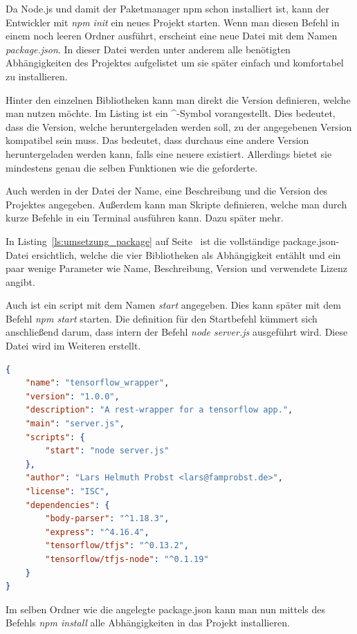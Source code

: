 Da Node.js und damit der Paketmanager npm schon installiert ist, kann der Entwickler mit \textit{npm init} ein neues 
Projekt starten. Wenn man diesen Befehl in einem noch leeren Ordner ausführt, erscheint eine neue Datei mit dem Namen
\textit{package.json}. In dieser Datei werden unter anderem alle benötigten Abhängigkeiten des Projektes aufgelistet 
um sie später einfach und komfortabel zu installieren.

Hinter den einzelnen Bibliotheken kann man direkt die Version definieren, welche man nutzen möchte. Im Listing ist ein
\textbf{\^}-Symbol vorangestellt. Dies bedeutet, dass die Version, welche heruntergeladen werden soll, zu der angegebenen
Version kompatibel sein muss. Das bedeutet, dass durchaus eine andere Version heruntergeladen werden kann, falls eine
neuere existiert. Allerdings bietet sie mindestens genau die selben Funktionen wie die geforderte.

Auch werden in der Datei der Name, eine Beschreibung und die Version des Projektes angegeben. Außerdem kann man Skripte
definieren, welche man durch kurze Befehle in ein Terminal ausführen kann. Dazu später mehr.

In Listing~\ref{ls:umsetzung_package} auf Seite~\pageref{ls:umsetzung_package} ist die vollständige package.json-Datei
ersichtlich, welche die vier Bibliotheken als Abhängigkeit entählt und ein paar wenige Parameter wie Name, Beschreibung,
Version und verwendete Lizenz angibt. 

Auch ist ein script mit dem Namen \textit{start} angegeben. Dies kann später mit dem Befehl \textit{npm start} starten.
Die definition für den Startbefehl kümmert sich anschließend darum, dass intern der Befehl \textit{node server.js}
ausgeführt wird. Diese Datei wird im Weiteren erstellt.

\begin{lstlisting}[language=JSON, caption=Die komplette package.json, label=ls:umsetzung_package]
{
    "name": "tensorflow_wrapper",
    "version": "1.0.0",
    "description": "A rest-wrapper for a tensorflow app.",
    "main": "server.js",
    "scripts": {
        "start": "node server.js"
    },
    "author": "Lars Helmuth Probst <lars@famprobst.de>",
    "license": "ISC",
    "dependencies": {
        "body-parser": "^1.18.3",
        "express": "^4.16.4",
        "tensorflow/tfjs": "^0.13.2",
        "tensorflow/tfjs-node": "^0.1.19"
    }
}
\end{lstlisting}

Im selben Ordner wie die angelegte package.json kann man nun mittels des Befehls \textit{npm install} alle Abhängigkeiten 
in das Projekt installieren. 

